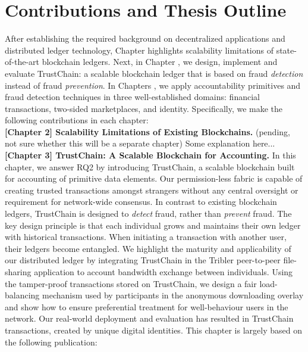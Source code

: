 
\section{Contributions and Thesis Outline}

After establishing the required background on decentralized applications and distributed ledger technology, Chapter  highlights scalability limitations of state-of-the-art blockchain ledgers.
Next, in Chapter , we design, implement and evaluate TrustChain: a scalable blockchain ledger that is based on fraud \emph{detection} instead of fraud \emph{prevention}.
In Chapters , we apply accountability primitives and fraud detection techniques in three well-established domains: financial transactions, two-sided marketplaces, and identity.
Specifically, we make the following contributions in each chapter:\\

\textbf{[Chapter 2] Scalability Limitations of Existing Blockchains.} (pending, not sure whether this will be a separate chapter)
Some explanation here...\\

\textbf{[Chapter 3] TrustChain: A Scalable Blockchain for Accounting.}
In this chapter, we answer RQ2 by introducing TrustChain, a scalable blockchain built for accounting of primitive data elements.
Our permission-less fabric is capable of creating trusted transactions amongst strangers without any central oversight or requirement for network-wide consensus.
In contrast to existing blockchain ledgers, TrustChain is designed to \emph{detect} fraud, rather than \emph{prevent} fraud.
The key design principle is that each individual grows and maintains their own ledger with historical transactions.
When initiating a transaction with another user, their ledgers become entangled.
We highlight the maturity and applicability of our distributed ledger by integrating TrustChain in the Tribler peer-to-peer file-sharing application to account bandwidth exchange between individuals.
Using the tamper-proof transactions stored on TrustChain, we design a fair load-balancing mechanism used by participants in the anonymous downloading overlay and show how to ensure preferential treatment for well-behaviour users in the network. %
Our real-world deployment and evaluation has resulted in  TrustChain transactions, created by  unique digital identities.
This chapter is largely based on the following publication:

